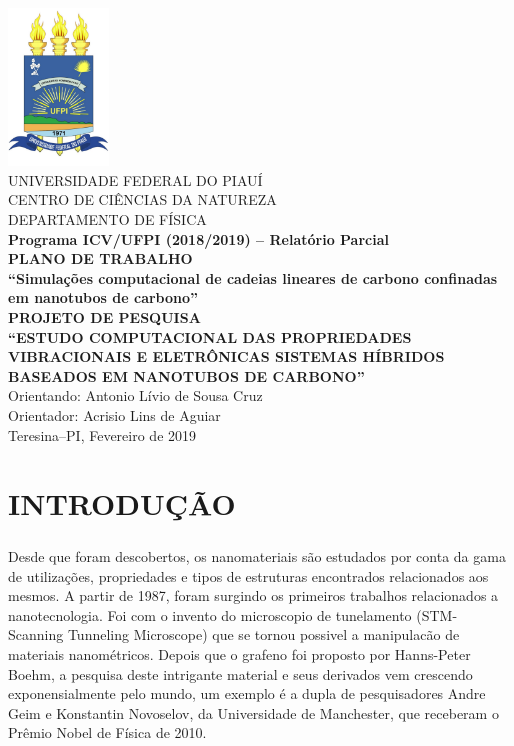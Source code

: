 \documentclass[12pt,a4paper]{report}
\begin{document}
\fontsize{12pt}{17pt}\selectfont

\begin{titlepage}
\begin{center}
\includegraphics[width=0.2\textwidth]{./logo1.pdf}\\[0.2cm]
\textsc{UNIVERSIDADE FEDERAL DO PIAUÍ}\\[0.2cm]
\textsc{CENTRO DE CIÊNCIAS DA NATUREZA}\\[0.2cm]
\textsc{DEPARTAMENTO DE FÍSICA}\\[2.0cm]
{\textbf{Programa ICV/UFPI (2018/2019) – Relatório Parcial}}\\[1.0cm]
{\textbf{PLANO DE TRABALHO}}\\[0.4cm]
{\textbf{``Simulações computacional de cadeias lineares de carbono confinadas em nanotubos de carbono''}}\\[1.5cm]
{\textbf{PROJETO DE PESQUISA}}\\[0.4cm]
{\textbf{``ESTUDO COMPUTACIONAL DAS PROPRIEDADES VIBRACIONAIS E ELETRÔNICAS 
SISTEMAS HÍBRIDOS BASEADOS EM NANOTUBOS DE CARBONO''}}\\[2.0cm]

{Orientando: Antonio Lívio de Sousa Cruz}\\[1.0cm]
{Orientador: Acrisio Lins de Aguiar}\\[1.0cm]
{Teresina--PI, Fevereiro de 2019}
\end{center}
\end{titlepage}
\setcounter{page}{2}

\chapter*{INTRODUÇÃO}
\paragraph{}
Desde que foram descobertos, os nanomateriais são estudados por conta da gama de utilizações, propriedades e tipos de estruturas encontrados relacionados aos mesmos. A partir de 1987, foram surgindo os primeiros trabalhos relacionados a nanotecnologia. Foi com o invento do 
microscopio de tunelamento (STM- Scanning Tunneling Microscope) que se tornou possivel a manipulacão de materiais nanométricos. Depois que o grafeno foi proposto por  Hanns-Peter Boehm, a pesquisa deste intrigante material e seus derivados vem crescendo exponensialmente pelo mundo, um exemplo é a dupla de pesquisadores Andre Geim e Konstantin Novoselov, da Universidade de Manchester, que receberam o Prêmio Nobel de Física de 2010.
\end{document}
